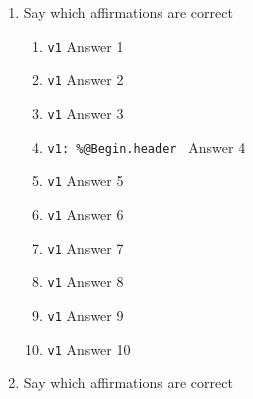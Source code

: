 \documentclass{article}%
\begin{document}
\begin{enumerate}

Given the code
\begin{lstlisting}
%\newtheorem{theorem}{Theorem}
%\newtheorem{acknowledgement}[theorem]{Acknowledgement}
%\newtheorem{algorithm}[theorem]{Algorithm}
%\newtheorem{axiom}[theorem]{Axiom}
%\newtheorem{case}[theorem]{Case}
%\newtheorem{claim}[theorem]{Claim}
%\newtheorem{conclusion}[theorem]{Conclusion}
%\newtheorem{condition}[theorem]{Condition}
%\newtheorem{conjecture}[theorem]{Conjecture}
\end{lstlisting}

\item Say which affirmations are correct
\begin{enumerate}
\item \verb+v1+ Answer 1
\item \verb+v1+ Answer 2
\item \verb+v1+ Answer 3
\item \verb+v1: %@Begin.header + Answer 4 %
\item \verb+v1+ Answer 5
\item \verb+v1+ Answer 6
\item \verb+v1+ Answer 7
\item \verb+v1+ Answer 8		%
\item \verb+v1+ Answer 9
\item \verb+v1+ Answer 10
\end{enumerate}
\item Say which affirmations are correct
\begin{enumerate}	


\end{enumerate}
\end{enumerate}
\end{document}
